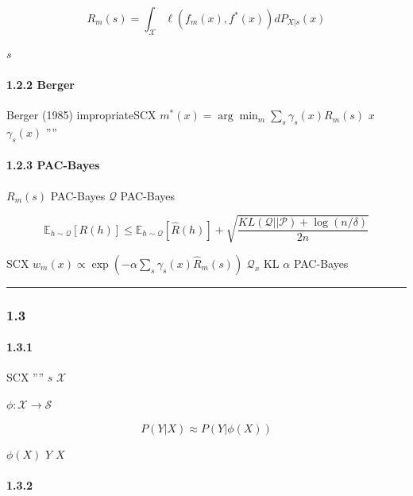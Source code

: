 \documentclass[
  12pt,
]{article}
\begin{document}
\[R_m(s) = \int_{\mathcal{X}} \ell(f_m(x), f^*(x)) dP_{X|s}(x)\]

\textbf{} \(s\) 

\paragraph{1.2.2 Berger
}\label{berger-ux7684ux5e7fux4e49ux8d1dux53f6ux65afux5206ux6790}

Berger (1985) 
impropriateSCX 
\(m^*(x) = \arg\min_m \sum_s \gamma_s(x) R_m(s)\)  \(x\)
 \(\gamma_s(x)\)
''''

\paragraph{1.2.3  PAC-Bayes
}\label{ux4e0e-pac-bayes-ux7684ux8054ux7cfb}

 \(R_m(s)\)  PAC-Bayes 
\(\mathcal{Q}\)  PAC-Bayes 

\[\mathbb{E}_{h \sim \mathcal{Q}}[R(h)] \leq \mathbb{E}_{h \sim \mathcal{Q}}[\hat{R}(h)] + \sqrt{\frac{KL(\mathcal{Q}||\mathcal{P}) + \log(n/\delta)}{2n}}\]

SCX 
\(w_m(x) \propto \exp(-\alpha \sum_s \gamma_s(x) \hat{R}_m(s))\)
\textbf{} \(\mathcal{Q}_x\) KL
 \(\alpha\) 
PAC-Bayes 

\begin{center}\rule{0.5\linewidth}{0.5pt}\end{center}

\subsubsection{1.3
}\label{ux72b6ux6001ux5212ux5206ux5145ux5206ux7edfux8ba1ux91cfux4e0eux4fe1ux606fux74f6ux9888}

\paragraph{1.3.1 }\label{ux72b6ux6001ux7684ux5b9aux4e49}

SCX '''' \(s\)  \(\mathcal{X}\)

\(\phi: \mathcal{X} \to \mathcal{S}\)

\[P(Y|X) \approx P(Y|\phi(X))\]

 \(\phi(X)\)  \(Y\)  \(X\) \textbf{}

\paragraph{1.3.2
}\label{ux5145ux5206ux7edfux8ba1ux91cfux7406ux8bba}
\end{document}
